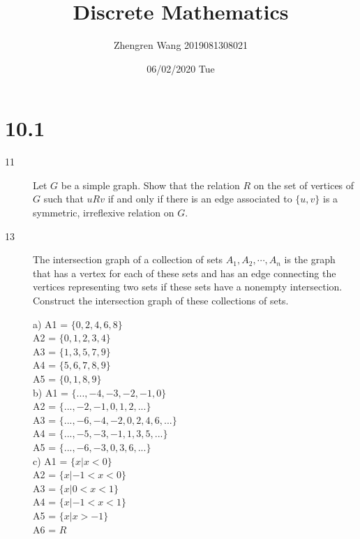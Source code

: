 \documentclass[UTF8]{article}
\title{Discrete Mathematics}
\author{Zhengren Wang 2019081308021}
\date{06/02/2020 Tue}
\begin{document}
\maketitle 
\part{10.1}
\begin{description}
    \item[11]Let $G$ be a simple graph. Show that the relation $R$ on the set of vertices of $G$ such that $uRv$ if and only if there is an edge associated to $\{u, v\}$ is a symmetric, irreflexive relation on $G$.

    \item[13]The intersection graph of a collection of sets $A_1, A_2,\cdots,A_n$ is the graph that has a vertex for each of these sets and has an edge connecting the vertices representing two sets if these sets have a nonempty intersection. Construct the intersection graph of these collections of sets.

            a) A1 = $\{0, 2, 4, 6, 8\}$ \\
               A2 = $\{0, 1, 2, 3, 4\}$ \\
               A3 = $\{1, 3, 5, 7, 9\}$ \\
               A4 = $\{5, 6, 7, 8, 9\}$ \\
               A5 = $\{0, 1, 8, 9\}$    \\

            b) A1 = $\{..., −4, −3, −2, −1, 0\}$          \\
               A2 = $\{..., −2, −1, 0, 1, 2,...\}$        \\
               A3 = $\{..., −6, −4, −2, 0, 2, 4, 6,...\}$ \\
               A4 = $\{..., −5, −3, −1, 1, 3, 5,...\}$    \\
               A5 = $\{..., −6, −3, 0, 3, 6,...\}$         \\

            c) A1 = $\{x | x < 0\}$    \\
               A2 = $\{x | −1 <x< 0\}$ \\
               A3 = $\{x | 0 <x< 1\}$  \\
               A4 = $\{x | −1 <x< 1\}$ \\
               A5 = $\{x | x > −1\}$   \\
               A6 = $R$               \\

\end{description}
\end{document}
